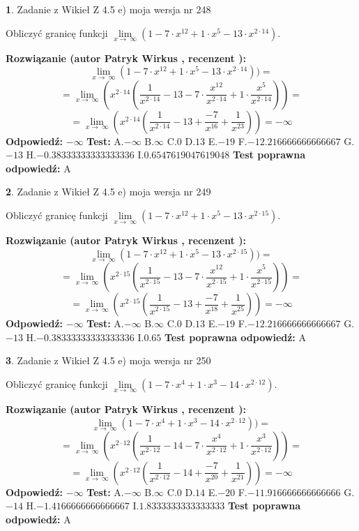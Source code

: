 \documentclass[12pt, a4paper]{article}
\theoremstyle{definition} %
\newtheorem{zad}{}
\newcommand{\zadStart}[1]{\begin{zad}#1\newline}
\newcommand{\zadStop}{\end{zad}}
\newcommand{\rozwStart}[2]{\noindent \textbf{Rozwiązanie (autor #1 , recenzent #2): }\newline}
\newcommand{\rozwStop}{\newline}
\newcommand{\odpStart}{\noindent \textbf{Odpowiedź:}\newline}
\newcommand{\odpStop}{\newline}
\newcommand{\testStart}{\noindent \textbf{Test:}\newline}
\newcommand{\testStop}{\newline}
\newcommand{\kluczStart}{\noindent \textbf{Test poprawna odpowiedź:}\newline}
\newcommand{\kluczStop}{\newline}
\begin{document}
\zadStart{Zadanie z Wikieł Z 4.5 e) moja wersja nr 248}


Obliczyć granicę funkcji  $\lim\limits_{x\to\ \infty}(1 - 7 \cdot x^{12}+1 \cdot x^{5}- 13 \cdot x^{2\cdot14})$.
\zadStop
\rozwStart{Patryk Wirkus}{}
$$\lim\limits_{x\to\ \infty}(1 - 7 \cdot x^{12}+1 \cdot x^{5}- 13 \cdot x^{2\cdot14}))=$$
$$=\lim\limits_{x\to\ \infty}(x^{2\cdot14}(\frac{1}{x^{2\cdot14}}-13 -7 \cdot \frac{x^{12}}{x^{2\cdot14}}+1 \cdot \frac{x^{5}}{x^{2\cdot14}}))=$$
$$=\lim\limits_{x\to\ \infty}(x^{2\cdot14}(\frac{1}{x^{2\cdot14}}-13 + \frac{-7}{x^{16}}+ \frac{1}{x^{23}}))=-\infty$$
\rozwStop
\odpStart
$-\infty$
\odpStop
\testStart
A.$-\infty$ B.$\infty$ C.$0$ D.$13$ E.$-19$
F.$-12.216666666666667$ G.$-13$
H.$-0.38333333333333336$
I.$0.6547619047619048$
\testStop
\kluczStart
A
\kluczStop



\zadStart{Zadanie z Wikieł Z 4.5 e) moja wersja nr 249}


Obliczyć granicę funkcji  $\lim\limits_{x\to\ \infty}(1 - 7 \cdot x^{12}+1 \cdot x^{5}- 13 \cdot x^{2\cdot15})$.
\zadStop
\rozwStart{Patryk Wirkus}{}
$$\lim\limits_{x\to\ \infty}(1 - 7 \cdot x^{12}+1 \cdot x^{5}- 13 \cdot x^{2\cdot15}))=$$
$$=\lim\limits_{x\to\ \infty}(x^{2\cdot15}(\frac{1}{x^{2\cdot15}}-13 -7 \cdot \frac{x^{12}}{x^{2\cdot15}}+1 \cdot \frac{x^{5}}{x^{2\cdot15}}))=$$
$$=\lim\limits_{x\to\ \infty}(x^{2\cdot15}(\frac{1}{x^{2\cdot15}}-13 + \frac{-7}{x^{18}}+ \frac{1}{x^{25}}))=-\infty$$
\rozwStop
\odpStart
$-\infty$
\odpStop
\testStart
A.$-\infty$ B.$\infty$ C.$0$ D.$13$ E.$-19$
F.$-12.216666666666667$ G.$-13$
H.$-0.38333333333333336$
I.$0.65$
\testStop
\kluczStart
A
\kluczStop



\zadStart{Zadanie z Wikieł Z 4.5 e) moja wersja nr 250}


Obliczyć granicę funkcji  $\lim\limits_{x\to\ \infty}(1 - 7 \cdot x^{4}+1 \cdot x^{3}- 14 \cdot x^{2\cdot12})$.
\zadStop
\rozwStart{Patryk Wirkus}{}
$$\lim\limits_{x\to\ \infty}(1 - 7 \cdot x^{4}+1 \cdot x^{3}- 14 \cdot x^{2\cdot12}))=$$
$$=\lim\limits_{x\to\ \infty}(x^{2\cdot12}(\frac{1}{x^{2\cdot12}}-14 -7 \cdot \frac{x^{4}}{x^{2\cdot12}}+1 \cdot \frac{x^{3}}{x^{2\cdot12}}))=$$
$$=\lim\limits_{x\to\ \infty}(x^{2\cdot12}(\frac{1}{x^{2\cdot12}}-14 + \frac{-7}{x^{20}}+ \frac{1}{x^{21}}))=-\infty$$
\rozwStop
\odpStart
$-\infty$
\odpStop
\testStart
A.$-\infty$ B.$\infty$ C.$0$ D.$14$ E.$-20$
F.$-11.916666666666666$ G.$-14$
H.$-1.4166666666666667$
I.$1.8333333333333333$
\testStop
\kluczStart
A
\kluczStop
\end{document}
